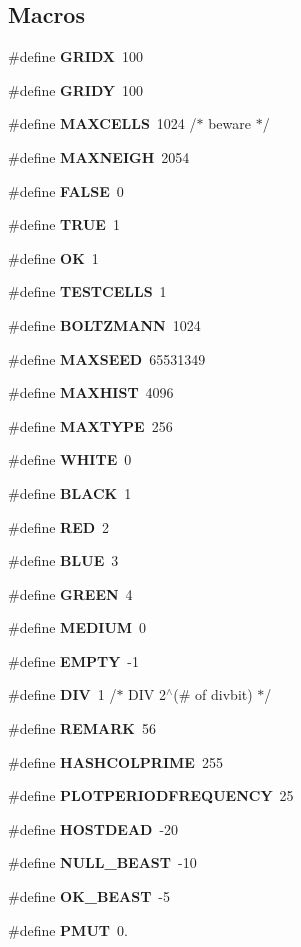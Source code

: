 \subsection*{Macros}
\begin{DoxyCompactItemize}
\item 
\#define {\bf G\-R\-I\-D\-X}~100
\item 
\#define {\bf G\-R\-I\-D\-Y}~100
\item 
\#define {\bf M\-A\-X\-C\-E\-L\-L\-S}~1024 /$\ast$  beware  $\ast$/
\item 
\#define {\bf M\-A\-X\-N\-E\-I\-G\-H}~2054
\item 
\#define {\bf F\-A\-L\-S\-E}~0
\item 
\#define {\bf T\-R\-U\-E}~1
\item 
\#define {\bf O\-K}~1
\item 
\#define {\bf T\-E\-S\-T\-C\-E\-L\-L\-S}~1
\item 
\#define {\bf B\-O\-L\-T\-Z\-M\-A\-N\-N}~1024
\item 
\#define {\bf M\-A\-X\-S\-E\-E\-D}~65531349
\item 
\#define {\bf M\-A\-X\-H\-I\-S\-T}~4096
\item 
\#define {\bf M\-A\-X\-T\-Y\-P\-E}~256
\item 
\#define {\bf W\-H\-I\-T\-E}~0
\item 
\#define {\bf B\-L\-A\-C\-K}~1
\item 
\#define {\bf R\-E\-D}~2
\item 
\#define {\bf B\-L\-U\-E}~3
\item 
\#define {\bf G\-R\-E\-E\-N}~4
\item 
\#define {\bf M\-E\-D\-I\-U\-M}~0
\item 
\#define {\bf E\-M\-P\-T\-Y}~-\/1
\item 
\#define {\bf D\-I\-V}~1   /$\ast$ D\-I\-V 2$^\wedge$(\# of divbit) $\ast$/
\item 
\#define {\bf R\-E\-M\-A\-R\-K}~56
\item 
\#define {\bf H\-A\-S\-H\-C\-O\-L\-P\-R\-I\-M\-E}~255
\item 
\#define {\bf P\-L\-O\-T\-P\-E\-R\-I\-O\-D\-F\-R\-E\-Q\-U\-E\-N\-C\-Y}~25
\item 
\#define {\bf H\-O\-S\-T\-D\-E\-A\-D}~-\/20
\item 
\#define {\bf N\-U\-L\-L\-\_\-\-B\-E\-A\-S\-T}~-\/10
\item 
\#define {\bf O\-K\-\_\-\-B\-E\-A\-S\-T}~-\/5
\item 
\#define {\bf P\-M\-U\-T}~0.

\end{DoxyCompactItemize}
